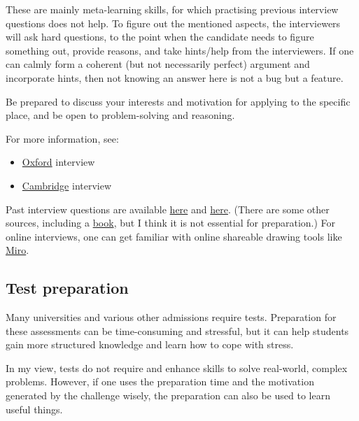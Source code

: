 \documentclass{article}
\begin{document}
These are mainly meta-learning skills, for which practising previous interview questions does not help. To figure out the mentioned aspects, the interviewers will ask hard questions, to the point when the candidate needs to figure something out, provide reasons, and take hints/help from the interviewers. If one can calmly form a coherent (but not necessarily perfect) argument and incorporate hints, then not knowing an answer here is not a bug but a feature.

Be prepared to discuss your interests and motivation for applying to the specific place, and be open to problem-solving and reasoning.

For more information, see:

\begin{itemize}
    \item \href{https://www.ox.ac.uk/admissions/undergraduate/applying-to-oxford/guide/interviews}{Oxford} interview
    \item \href{https://www.undergraduate.study.cam.ac.uk/applying/interviews}{Cambridge} interview
\end{itemize}

Past interview questions are available \href{https://web.archive.org/web/20211128092333/https://www.ianramsey.org.uk/wp-content/uploads/2020/08/Sample-Oxbridge-Interview-Questions.pdf}{here} and \href{https://web.archive.org/web/20231204201527/https://www.thatoxfordgirl.com/post/50-real-life-oxford-university-interview-questions}{here}. (There are some other sources, including a  \href{https://www.amazon.com/Ultimate-Oxbridge-Interview-Guide-UniAdmissions/dp/0993231136}{book}, but I think it is not essential for preparation.)
For online interviews, one can get familiar with online shareable drawing tools like \href{https://miro.com/app/dashboard/}{Miro}.

\subsection{Test preparation}

Many universities and various other admissions require tests. Preparation for these assessments can be time-consuming and stressful, but it can help students gain more structured knowledge and learn how to cope with stress.

In my view, tests do not require and enhance skills to solve real-world, complex problems. However, if one uses the preparation time and the motivation generated by the challenge wisely, the preparation can also be used to learn useful things.
\end{document}
